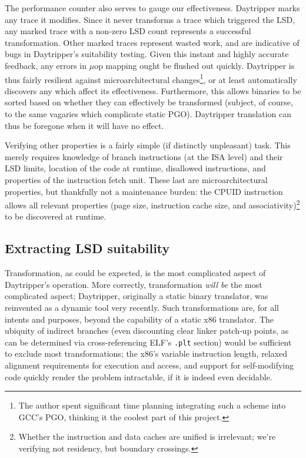 \documentclass[]{sigplanconf}
\begin{document}
The performance counter also serves to gauge our effectiveness. Daytripper
marks any trace it modifies. Since it never transforms a trace which triggered
the LSD, any marked trace with a non-zero LSD count represents a successful
transformation. Other marked traces represent wasted work, and are indicative
of bugs in Daytripper's suitability testing. Given this instant and highly
accurate feedback, any errors in $\mu$op mapping ought be flushed out quickly.
Daytripper is thus fairly resilient against microarchitectural changes\footnote{The
author spent significant time planning integrating such a scheme into GCC's PGO, thinking
it the coolest part of this project.}, or at least automatically discovers any
which affect its effectiveness. Furthermore, this allows binaries to be
sorted based on whether they can effectively be transformed (subject, of course,
to the same vagaries which complicate static PGO). Daytripper translation can
thus be foregone when it will have no effect.

Verifying other properties is a fairly simple (if distinctly unpleasant) task.
This merely requires knowledge of branch instructions (at the ISA level) and
their LSD limits, location of the code at runtime, disallowed instructions,
and properties of the instruction fetch unit. These last are microarchitectural
properties, but thankfully not a maintenance burden: the CPUID instruction
allows all relevant properties (page size, instruction cache size, and
associativity)\footnote{Whether the instruction and data caches are unified is irrelevant;
we're verifying not residency, but boundary crossings.} to be discovered
at runtime.

\subsection{Extracting LSD suitability}
Transformation, as could be expected, is the most complicated aspect of
Daytripper's operation. More correctly, transformation \textit{will be} the
most complicated aspect; Daytripper, originally a static binary translator,
was reinvented as a dynamic tool very recently. Such transformations are, for
all intents and purposes, beyond the capability of a static x86 translator.
The ubiquity of indirect branches (even discounting clear linker patch-up points,
as can be determined via cross-referencing ELF's \texttt{.plt} section) would
be sufficient to exclude most transformations\cite{landi}; the x86's variable
instruction length, relaxed alignment requirements for execution and access,
and support for self-modifying code quickly render the problem intractable,
if it is indeed even decidable.
\end{document}
